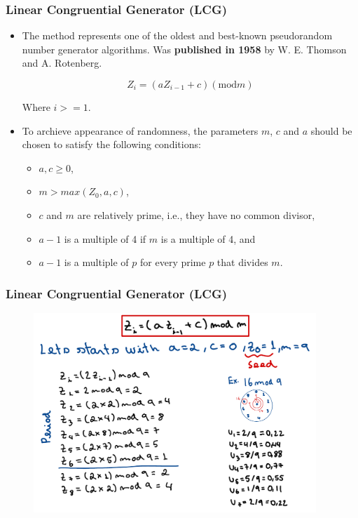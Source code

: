 \begin{frame}
    \frametitle{Linear Congruential Generator (LCG)}
    \begin{itemize}

        \item The method represents one of the oldest and best-known pseudorandom 
        number generator algorithms. Was \textbf{published in 1958} by W. E. Thomson and A. Rotenberg.
    
        $$Z_i = (aZ_{i-1}+c)(\text{mod} m)$$

        Where $i>=1$.
        
        \item To archieve appearance of randomness, the parameters $m$, $c$ and $a$ should be
        chosen to satisfy the following conditions:

        \begin{itemize}
            \item $a, c \geq 0$,
            \item $m > max(Z_0,a,c)$,
            \item $c$ and $m$ are relatively prime, i.e., they have no common divisor,
            \item $a-1$ is a multiple of 4 if $m$ is a multiple of 4, and
            \item $a-1$ is a multiple of $p$ for every prime $p$ that divides $m$.
        \end{itemize}
  
    \end{itemize}
\end{frame}

\begin{frame}
    \frametitle{Linear Congruential Generator (LCG)}
    \begin{figure}
        \centering
        \includegraphics[width=0.95\textwidth]{sections/prng/figures/lcg_example.pdf}
    \end{figure}
\end{frame}

